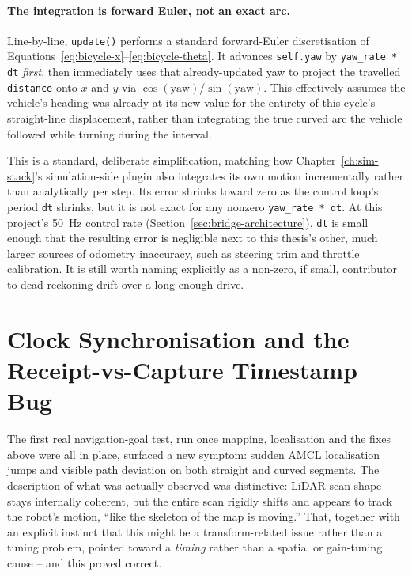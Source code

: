 \paragraph{The integration is forward Euler, not an exact arc.}
Line-by-line, \texttt{update()} performs a standard forward-Euler
discretisation of Equations~\ref{eq:bicycle-x}--\ref{eq:bicycle-theta}.
It advances \texttt{self.yaw} by \texttt{yaw\_rate * dt} \emph{first},
then immediately uses that already-updated yaw to project the
travelled \texttt{distance} onto $x$ and $y$ via
$\cos(\text{yaw})$/$\sin(\text{yaw})$. This effectively assumes the
vehicle's heading was already at its new value for the entirety of
this cycle's straight-line displacement, rather than integrating the
true curved arc the vehicle followed while turning during the
interval.

This is a standard, deliberate simplification, matching how
Chapter~\ref{ch:sim-stack}'s simulation-side plugin also integrates
its own motion incrementally rather than analytically per step. Its
error shrinks toward zero as the control loop's period \texttt{dt}
shrinks, but it is not exact for any nonzero \texttt{yaw\_rate * dt}.
At this project's \SI{50}{\hertz} control rate
(Section~\ref{sec:bridge-architecture}), \texttt{dt} is small enough
that the resulting error is negligible next to this thesis's other,
much larger sources of odometry inaccuracy, such as steering trim
and throttle calibration. It is still worth naming explicitly as a
non-zero, if small, contributor to dead-reckoning drift over a long
enough drive.

\section{Clock Synchronisation and the Receipt-vs-Capture Timestamp Bug}
\label{sec:clock-offset}

The first real navigation-goal test, run once mapping,
localisation and the fixes above were all in place, surfaced a new
symptom: sudden AMCL localisation jumps and visible path deviation
on both straight and curved segments. The description of what was actually observed was
distinctive: LiDAR scan shape stays internally coherent, but the
entire scan rigidly shifts and appears to track the robot's motion,
``like the skeleton of the map is moving.'' That, together with an
explicit instinct that this might be a transform-related issue
rather than a tuning problem, pointed toward a \emph{timing} rather
than a spatial or gain-tuning cause -- and this proved correct.

